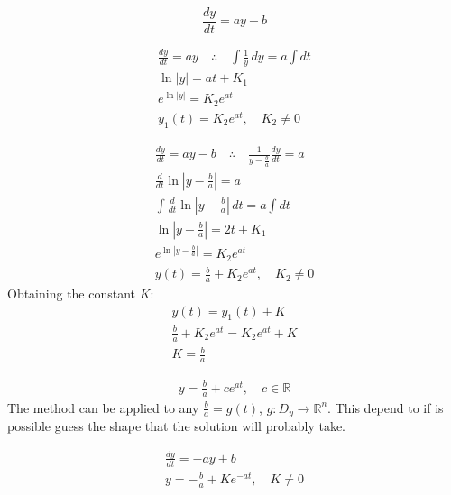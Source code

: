 \begin{solution}
	$$\frac{dy}{dt}=ay-b$$
	\begin{solparts}
		\item
		\begin{gather*}
			\frac{dy}{dt}=ay \quad \therefore \quad \int \frac{1}{y}\, dy=a\int dt\\
			\ln|y|=at+K_1\\
			e^{\ln|y|}=K_2e^{at}\\
			\boxed{y_1(t)=K_2e^{at}, \quad K_2 \neq 0}
		\end{gather*}
	
		\item
		\begin{gather*}
			\frac{dy}{dt}=ay-b \quad \therefore \quad \frac{1}{y-\frac{b}{a}}\frac{dy}{dt}=a\\
			\frac{d}{dt}\ln\left|y-\frac{b}{a}\right|=a\\
			\int \frac{d}{dt}\ln\left|y-\frac{b}{a}\right| \, dt=a\int dt\\
			\ln\left|y-\frac{b}{a}\right|=2t+K_1\\
			e^{\ln\left|y-\frac{b}{a}\right|}=K_2e^{at}\\
			y(t)=\frac{b}{a}+K_2e^{at}, \quad K_2 \neq 0
		\end{gather*}
			Obtaining the constant $K$:
		\begin{gather*}
			y(t)=y_1(t)+K\\
			\frac{b}{a}+K_2e^{at}=K_2e^{at}+K\\
			\boxed{K=\frac{b}{a}}
		\end{gather*}
		\item
		\begin{gather*}
			y=\frac{b}{a}+ce^{at}, \quad c \in \mathbb{R}
		\end{gather*}
			The method can be applied to any $\frac{b}{a}=g(t)$, $g:D_y \to \mathbb{R}^n$. This depend to if is possible guess the shape that the solution will probably take.
	\end{solparts}
\end{solution}

\begin{solution}
	\begin{gather*}
		\frac{dy}{dt}=-ay+b\\
		\boxed{y=-\frac{b}{a}+Ke^{-at}, \quad K \neq 0}
	\end{gather*}
\end{solution}

